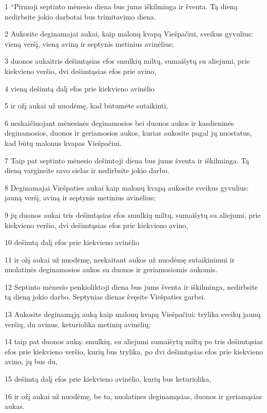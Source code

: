 \par 1 “Pirmoji septinto mėnesio diena bus jums iškilminga ir šventa. Tą dieną nedirbsite jokio darbo­tai bus trimitavimo diena. 
\par 2 Aukosite deginamajai aukai, kaip malonų kvapą Viešpačiui, sveikus gyvulius: vieną veršį, vieną aviną ir septynis metinius avinėlius; 
\par 3 duonos aukai­tris dešimtąsias efos smulkių miltų, sumaišytų su aliejumi, prie kiekvieno veršio, dvi dešimtąsias efos prie avino, 
\par 4 vieną dešimtą dalį efos prie kiekvieno avinėlio 
\par 5 ir ožį aukai už nuodėmę, kad būtumėte sutaikinti, 
\par 6 neskaičiuojant mėnesinės deginamosios bei duonos aukos ir kasdieninės deginamosios, duonos ir geriamosios aukos, kurias aukosite pagal jų nuostatus, kad būtų malonus kvapas Viešpačiui. 
\par 7 Taip pat septinto mėnesio dešimtoji diena bus jums šventa ir iškilminga. Tą dieną varginsite savo sielas ir nedirbsite jokio darbo. 
\par 8 Deginamajai Viešpaties aukai kaip malonų kvapą aukosite sveikus gyvulius: jauną veršį, aviną ir septynis metinius avinėlius; 
\par 9 jų duonos aukai tris dešimtąsias efos smulkių miltų, sumaišytų su aliejumi, prie kiekvieno veršio, dvi dešimtąsias efos prie kiekvieno avino, 
\par 10 dešimtą dalį efos prie kiekvieno avinėlio 
\par 11 ir ožį aukai už nuodėmę, neskaitant aukos už nuodėmę sutaikinimui ir nuolatinės deginamosios aukos su duonos ir geriamosiomis aukomis. 
\par 12 Septinto mėnesio penkioliktoji diena bus jums šventa ir iškilminga, nedirbsite tą dieną jokio darbo. Septynias dienas švęsite Viešpaties garbei. 
\par 13 Aukosite deginamąją auką kaip malonų kvapą Viešpačiui: trylika sveikų jaunų veršių, du avinus, keturiolika metinių avinėlių; 
\par 14 taip pat duonos auką: smulkių, su aliejumi sumaišytų miltų po tris dešimtąsias efos prie kiekvieno veršio, kurių bus trylika, po dvi dešimtąsias efos prie kiekvieno avino, jų bus du, 
\par 15 dešimtą dalį efos prie kiekvieno avinėlio, kurių bus keturiolika, 
\par 16 ir ožį aukai už nuodėmę, be to, nuolatines deginamąsias, duonos ir geriamąsias aukas. 
